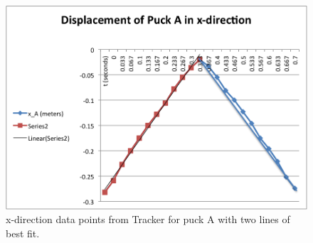 \documentclass[11pt]{article}
\begin{document}
% 

\begin{figure}[!h]
     \includegraphics{x_A.png}
     \caption{x-direction data points from Tracker for puck A with two lines of best fit.}
     \label{xA}
\end{figure}
\end{document}
